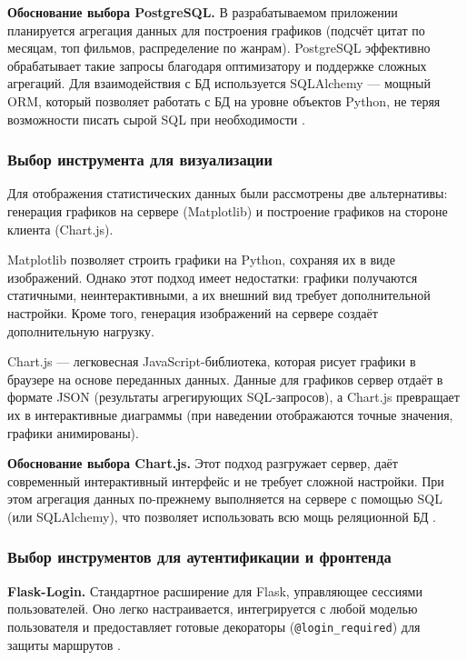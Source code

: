 \textbf{Обоснование выбора PostgreSQL.} В разрабатываемом приложении планируется агрегация 
данных для построения графиков (подсчёт цитат по месяцам, топ фильмов, распределение по 
жанрам). PostgreSQL эффективно обрабатывает такие запросы благодаря оптимизатору и поддержке 
сложных агрегаций. Для взаимодействия с БД используется SQLAlchemy — мощный ORM, который 
позволяет работать с БД на уровне объектов Python, не теряя возможности писать сырой SQL 
при необходимости \cite{sqlalchemy_docs}. 

\subsubsection{Выбор инструмента для визуализации}

Для отображения статистических данных были рассмотрены две альтернативы: генерация графиков 
на сервере (Matplotlib) и построение графиков на стороне клиента (Chart.js).

Matplotlib позволяет строить графики на Python, сохраняя их в виде изображений. Однако этот 
подход имеет недостатки: графики получаются статичными, неинтерактивными, а их внешний вид 
требует дополнительной настройки. Кроме того, генерация изображений на сервере создаёт 
дополнительную нагрузку.

Chart.js — легковесная JavaScript-библиотека, которая рисует графики в браузере на основе 
переданных данных. Данные для графиков сервер отдаёт в формате JSON (результаты агрегирующих 
SQL-запросов), а Chart.js превращает их в интерактивные диаграммы (при наведении 
отображаются точные значения, графики анимированы).

\textbf{Обоснование выбора Chart.js.} Этот подход разгружает сервер, даёт современный 
интерактивный интерфейс и не требует сложной настройки. При этом агрегация данных 
по-прежнему выполняется на сервере с помощью SQL (или SQLAlchemy), что позволяет 
использовать всю мощь реляционной БД \cite{chartjs_docs}. 

\subsubsection{Выбор инструментов для аутентификации и фронтенда}

\textbf{Flask-Login.} Стандартное расширение для Flask, управляющее сессиями пользователей. 
Оно легко настраивается, интегрируется с любой моделью пользователя и предоставляет готовые 
декораторы (\texttt{@login\_required}) для защиты маршрутов \cite{flask_login_docs}. 

